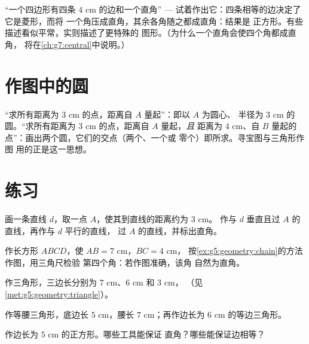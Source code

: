\begin{example}[由描述辨认图形]\label{ex:g5:geometry:recognize}
“一个四边形有四条 $4$ cm 的边和一个直角” ---
试着作出它：四条相等的边决定了它是菱形，而将
一个角压成直角，其余各角随之都成直角：结果是
正方形。有些描述看似平常，实则描述了更特殊的
图形。（为什么一个直角会使四个角都成直角，
将在\cref{ch:g7:central}中说明。）
\end{example}

\section{作图中的圆}

\begin{example}[把圆当作工具]\label{ex:g5:geometry:circle}
“求所有距离为 $3$ cm 的点，距离自 $A$ 量起”：即以 $A$ 为圆心、
半径为 $3$ cm 的圆。“求所有距离为 $3$ cm 的点，距离自 $A$ 量起，\emph{且}
距离为 $4$ cm、自 $B$ 量起的点”：画出两个圆，它们的交点（两个、一个或
零个）即所求。寻宝图与三角形作图
用的正是这一思想。
\end{example}

\section{练习}

\begin{exercise}[$\star$]\label{exo:g5:geometry:1}
画一条直线 $d$，取一点 $A$，使其到直线的距离约为 $3$ cm。
作与 $d$ 垂直且过 $A$ 的直线，再作与 $d$ 平行的直线，
过 $A$ 的直线，并标出直角。
\end{exercise}

\begin{exercise}[$\star$]\label{exo:g5:geometry:2}
作长方形 $ABCD$，使 $AB = 7$ cm，$BC = 4$ cm，
按\cref{ex:g5:geometry:chain}的方法作图，用三角尺检验
第四个角：若作图准确，该角
自然为直角。
\end{exercise}

\begin{exercise}[$\star$]\label{exo:g5:geometry:3}
作三角形，三边长分别为 $7$ cm、$6$ cm 和 $3$ cm，
（见\cref{met:g5:geometry:triangle}）。
\end{exercise}

\begin{exercise}[$\star$]\label{exo:g5:geometry:4}
作等腰三角形，底边长 $5$ cm，腰长
$7$ cm；再作边长为 $6$ cm 的等边三角形。
\end{exercise}

\begin{exercise}[$\star$]\label{exo:g5:geometry:5}
作边长为 $5$ cm 的正方形。哪些工具能保证
直角？哪些能保证边相等？
\end{exercise}

